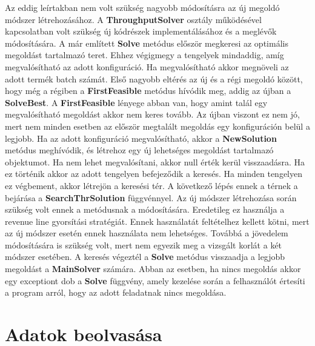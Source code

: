Az eddig leírtakban nem volt szükség nagyobb módosításra az új megoldó módszer létrehozásához. A \textbf{ThroughputSolver} osztály működésével kapcsolatban volt szükség új kódrészek implementálásához és a meglévők módosítására. A már említett \textbf{Solve} metódus először megkeresi az optimális megoldást tartalmazó teret. Ehhez végigmegy a tengelyek mindaddig, amíg megvalósítható az adott konfiguráció. Ha megvalósítható akkor megnöveli az adott termék batch számát. Első nagyobb eltérés az új és a régi megoldó között, hogy még a régiben a \textbf{FirstFeasible} metódus hívódik meg, addig az újban a \textbf{SolveBest}. A \textbf{FirstFeasible} lényege abban van, hogy amint talál egy megvalósítható megoldást akkor nem keres tovább. Az újban viszont ez nem jó, mert nem minden esetben az először megtalált megoldás egy konfiguráción belül a legjobb. Ha az adott konfiguráció megvalósítható, akkor a \textbf{NewSolution}
metódus meghívódik, és létrehoz egy új lehetséges megoldást tartalmazó objektumot. Ha nem lehet megvalósítani, akkor null érték kerül visszaadásra. Ha ez történik akkor az adott tengelyen befejeződik a keresés. Ha minden tengelyen ez végbement, akkor létrejön a keresési tér. A következő lépés ennek a térnek a bejárása a \textbf{SearchThrSolution} függvénnyel. Az új módszer létrehozása során szükség volt ennek a metódusnak a módosítására. Eredetileg ez használja a revenue line gyorsítási stratégiát. Ennek használatát feltételhez kellett kötni, mert az új módszer esetén ennek használata nem lehetséges. Továbbá a jövedelem módosítására is szükség volt, mert nem egyezik meg a vizsgált korlát a két módszer esetében. A keresés végeztél a \textbf{Solve} metódus visszaadja a legjobb megoldást a \textbf{MainSolver} számára. Abban az esetben, ha nincs megoldás akkor egy exceptiont dob a \textbf{Solve} függvény, amely kezelése során a felhasználót értesíti a program arról, hogy az adott feladatnak nincs megoldása.

\section{Adatok beolvasása}
